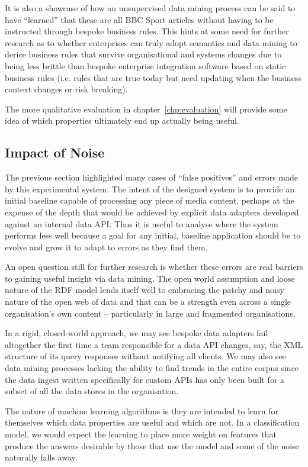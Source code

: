 It is also a showcase of how an unsupervised data mining process can
be said to have ``learned'' that these are all BBC Sport articles
without having to be instructed through bespoke business rules. This
hints at some need for further research as to whether enterprises
can truly adopt semantics and data mining to derice business rules
that survive organisational and systems changes due to being less
brittle than bespoke enterprise integration software based on static
business rules (i.e. rules that are true today but need updating when
the business context changes or risk breaking).

The more qualitative evaluation in chapter~\ref{chp:evaluation} will
provide some idea of which properties ultimately end up actually being
useful.

\subsection{Impact of Noise}

The previous section highlighted many cases of ``false positives''
and errors made by this experimental system. The intent of the
designed system is to provide an
initial baseline capable of processing any piece of media content,
perhaps at the expense of the depth that would be achieved by explicit
data adapters developed against an internal data API. Thus it is
useful to analyse where the system performs less well because a goal
for any initial, baseline application should be to evolve and grow it
to adapt to errors as they find them.

An open question still for further research is whether these errors
are real barriers to gaining useful insight via data mining. The
open world assumption and loose nature of the RDF model lends itself
well to embracing the patchy and noisy nature of the open web of data
and that can be a strength even across a single organisation's
own content -- particularly in large and fragmented organisations.

In a rigid, closed-world approach, we may see bespoke data adapters
fail altogether the first time a team responsible for a data API
changes, say, the XML structure of its query responses without
notifying all clients. We may also see data mining processes lacking
the ability to find trends in the entire corpus since the data
ingest written specifically for custom APIs has only been built for
a subset of all the data stores in the organisation.

The nature of machine learning algorithms is they are intended to
learn for themselves which data properties are useful and which are
not. In a classification model, we would expect the learning to
place more weight on features that produce the answers desirable
by those that use the model and some of the noise naturally falls
away.

